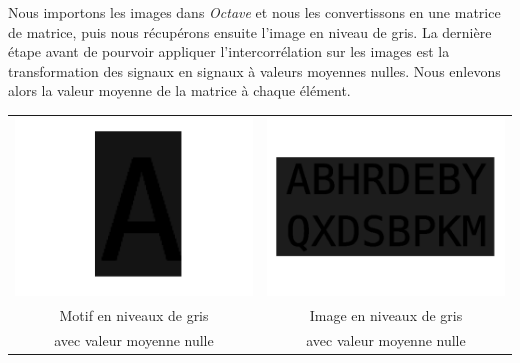 \documentclass[a4paper,12pt,titlepage]{report}
\newcommand{\octave}{\textit{Octave }}
\begin{document}
	Nous importons les images dans \octave et nous les convertissons en une matrice de matrice, puis nous récupérons ensuite l'image en niveau de gris. La dernière étape avant de pourvoir appliquer l'intercorrélation sur les images est la transformation des signaux en signaux à valeurs moyennes nulles. Nous enlevons alors la valeur moyenne de la matrice à chaque élément.
	\begin{center}
	\begin{tabular}{cc}
			\includegraphics[scale=0.15]{illus/motifm0.png} & \includegraphics[scale=0.4]{illus/motm0.png}\\
			Motif en niveaux de gris  & Image en niveaux de gris \\
			avec valeur moyenne nulle & avec valeur moyenne nulle\\
	\end{tabular}	
	\end{center}
	
\end{document}
